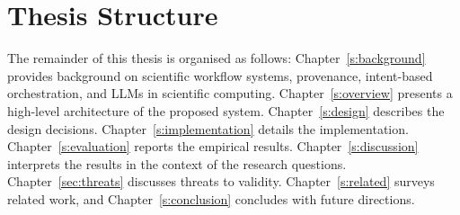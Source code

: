 \section{Thesis Structure}

The remainder of this thesis is organised as follows: Chapter~\ref{s:background}
provides background on scientific workflow systems, provenance, intent-based
orchestration, and LLMs in scientific computing. Chapter~\ref{s:overview}
presents a high-level architecture of the proposed system. Chapter~\ref{s:design}
describes the design decisions. Chapter~\ref{s:implementation} details the
implementation. Chapter~\ref{s:evaluation} reports the empirical results.
Chapter~\ref{s:discussion} interprets the results in the context of the research
questions. Chapter~\ref{sec:threats} discusses threats to validity.
Chapter~\ref{s:related} surveys related work, and Chapter~\ref{s:conclusion}
concludes with future directions.




